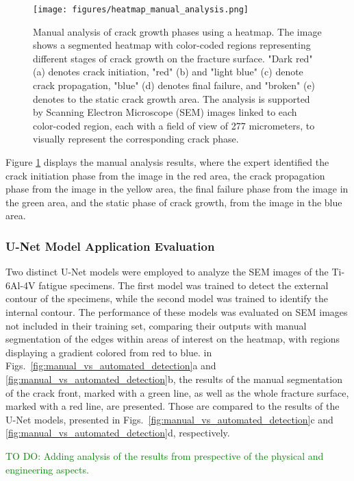 \documentclass[preprint,12pt]{elsarticle}
\begin{document}
\begin{figure}[ht!]
\centering
\texttt{[image: figures/heatmap\_manual\_analysis.png]}
\caption{Manual analysis of crack growth phases using a heatmap. The image shows a segmented heatmap with color-coded regions representing different stages of crack growth on the fracture surface. "Dark red" (a) denotes crack initiation, "red" (b) and "light blue" (c) denote crack propagation, "blue" (d) denotes final failure, and "broken" (e) denotes to the static crack growth area. The analysis is supported by Scanning Electron Microscope (SEM) images linked to each color-coded region, each with a field of view of 277 micrometers, to visually represent the corresponding crack phase.}
\label{fig:heatmap_manual_analysis}
\end{figure}

Figure \ref{fig:heatmap_manual_analysis} displays the manual analysis results,
where the expert identified the crack initiation phase from the image in the red area,
the crack propagation phase from the image in the yellow area,
the final failure phase from the image in the green area, and the static phase of crack growth,
from the image in the blue area.

\subsubsection{U-Net Model Application Evaluation}
Two distinct U-Net models were employed to analyze the SEM images of the Ti-6Al-4V fatigue specimens.
The first model was trained to detect the external contour of the specimens, while the second model was trained to identify the internal contour.
The performance of these models was evaluated on SEM images not included in their training set, comparing their outputs with manual segmentation of the edges within areas of interest on the heatmap, with regions displaying a gradient colored from red to blue.
in Figs.~\ref{fig:manual_vs_automated_detection}a and \ref{fig:manual_vs_automated_detection}b, the results of the manual segmentation of the crack front, marked with a green line, as well as the whole fracture surface, marked with a red line, are presented.
Those are compared to the results of the U-Net models, presented in Figs.~\ref{fig:manual_vs_automated_detection}c and \ref{fig:manual_vs_automated_detection}d, respectively.


\textcolor{green}{TO DO: Adding analysis of the results from prespective of the physical and engineering aspects.}
\end{document}
